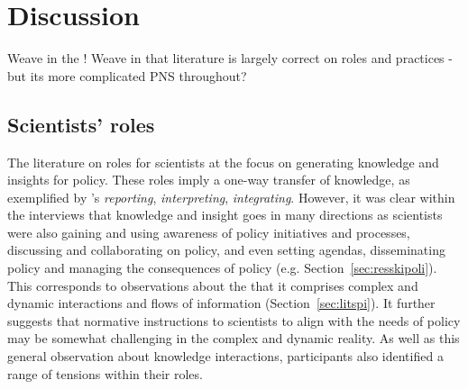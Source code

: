 \chapter{Discussion}\label{ch:discussion}


Weave in the \IDM!
Weave in that literature is largely correct on roles and practices - but its more complicated
PNS throughout?
\section{Scientists' roles}\label{sec:disroles}

The literature on roles for scientists at the \SPI{} focus on generating knowledge and insights for policy. These roles imply a one-way transfer of knowledge, as exemplified by \textcite{SteelLLS2004}'s \emph{reporting}, \emph{interpreting}, \emph{integrating}. However, it was clear within the interviews that knowledge and insight goes in many directions as scientists were also gaining and using awareness of policy initiatives and processes, discussing and collaborating on policy, and even setting agendas, disseminating policy and managing the consequences of policy (e.g. Section~\ref{sec:resskipoli}). This corresponds to observations about the \SPI{} that it comprises complex and dynamic interactions and flows of information (Section~\ref{sec:litspi}). It further suggests that normative instructions to scientists to align with the needs of policy may be somewhat challenging in the complex and dynamic reality. As well as this general observation about knowledge interactions, participants also identified a range of tensions within their roles. 

